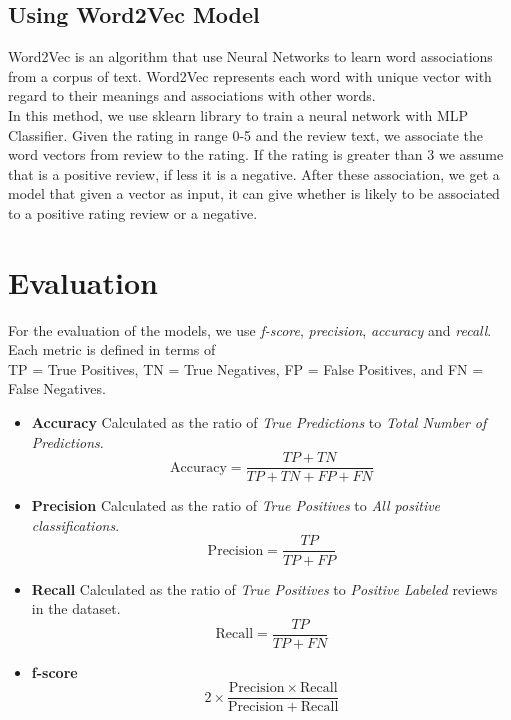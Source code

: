 \documentclass[11pt,a4paper]{article}
\begin{document}
\subsection{Using Word2Vec Model}
Word2Vec is an algorithm that use Neural Networks to learn word associations from a corpus of text. Word2Vec represents each word with unique vector with regard to their meanings and associations with other words. \\
In this method, we use sklearn library to train a neural network with MLP Classifier. Given the rating in range 0-5 and the review text, we associate the word vectors from review to the rating. If the rating is greater than 3 we assume that is a positive review, if less it is a negative. After these association, we get a model that given a vector as input, it can give whether is likely to be associated to a positive rating review or a negative. 

\section{Evaluation}
For the evaluation of the models, we use \textit{f-score}, \textit{precision}, \textit{accuracy} and \textit{recall}. Each metric is defined in terms of \\TP = True Positives, TN = True Negatives, FP = False Positives, and FN = False Negatives.

\begin{itemize}
	\item \textbf{Accuracy}
		Calculated as the ratio of \textit{True Predictions} to  \textit{Total Number of Predictions}. 
		\begin{equation}
			\mathrm{Accuracy} = \frac{TP + TN}{TP + TN + FP + FN}
		\end{equation}

	
	\item \textbf{Precision}
		 Calculated as the ratio of \textit{True Positives} to  \textit{All positive classifications}.
		\begin{equation}
			\mathrm{Precision} =\frac{TP}{TP + FP}
		\end{equation}

	\item \textbf{Recall}
		 Calculated as the ratio of \textit{True Positives} to  \textit{Positive Labeled} reviews in the dataset. 
		\begin{equation}
			\mathrm{Recall} = \frac{TP}{TP + FN}
		\end{equation}
	\item \textbf{f-score}
	\begin{equation}
		2 \times \frac{\mathrm{Precision}\times\mathrm{Recall}}{\mathrm{Precision} + \mathrm{Recall}}
	\end{equation}
\end{itemize}
\end{document}
